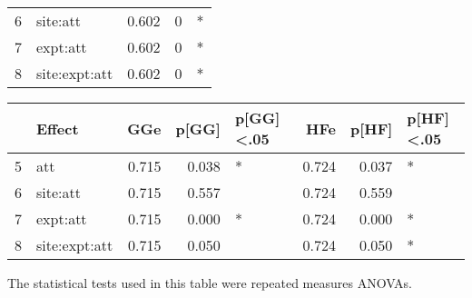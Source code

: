 \documentclass[
]{article}
\begin{document}
\begin{table}[!h]
\begin{tabular}[t]{llrrl}
6 & site:att & 0.602 & 0 & *\\
 
7 & expt:att & 0.602 & 0 & *\\
 
8 & site:expt:att & 0.602 & 0 & *\\
\bottomrule
\end{tabular}
\centering
\begin{tabular}[t]{llrrlrrl}
\toprule
  & Effect & GGe & p[GG] & p[GG]<.05 & HFe & p[HF] & p[HF]<.05\\
\midrule
5 & att & 0.715 & 0.038 & * & 0.724 & 0.037 & *\\
 
6 & site:att & 0.715 & 0.557 &  & 0.724 & 0.559 & \\
 
7 & expt:att & 0.715 & 0.000 & * & 0.724 & 0.000 & *\\
 
8 & site:expt:att & 0.715 & 0.050 &  & 0.724 & 0.050 & *\\
\bottomrule
\end{tabular}
\end{table}

The statistical tests used in this table were repeated measures ANOVAs.
\end{document}
